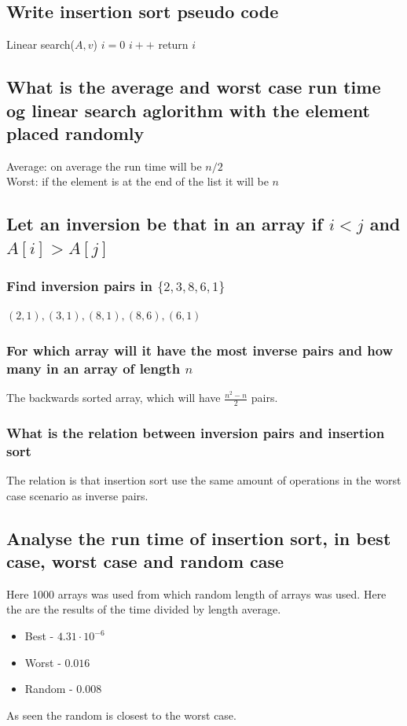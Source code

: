 \documentclass[12pt, a4paper]{article}
\begin{document}
			\subsection{Write insertion sort pseudo code}
				\begin{algorithmic}[1]
					\State Linear search($A,v$)
					\State $i=0$
						\State $i++$
					\EndWhile
					\State return $i$
				\end{algorithmic}
			\subsection{What is the average and worst case run time og linear search aglorithm with the element placed randomly}
				Average: on average the run time will be $n/2$ \\
				Worst: if the element is at the end of the list it will be $n$
			\subsection{Let an inversion be that in an array if $i<j$ and $A[i]>A[j]$}
				\subsubsection{Find inversion pairs in $\{2,3,8,6,1\}$}
					$(2,1),(3,1),(8,1),(8,6),(6,1)$
				\subsubsection{For which array will it have the most inverse pairs and how many in an array of length $n$}
					The backwards sorted array, which will have $\frac{n^2-n}{2}$ pairs.
				\subsubsection{What is the relation between inversion pairs and insertion sort}
					The relation is that insertion sort use the same amount of operations in the worst case scenario as inverse pairs.
			\subsection{Analyse the run time of insertion sort, in best case, worst case and random case}
				Here 1000 arrays was used from which random length of arrays was used. Here the are the results of the time divided by length average.\\
				\begin{itemize}
					\item Best - $4.31\cdot 10^{-6}$
					\item Worst - $0.016$
					\item Random - $0.008$
				\end{itemize}
				As seen the random is closest to the worst case. 
\end{document}
